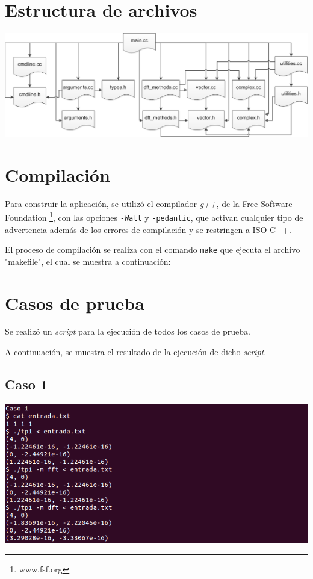 \documentclass{article}
\begin{document}
\section{Estructura de archivos}

\begin{center}
  \includegraphics[width=0.8\paperwidth]{Imagenes/jerarquia_de_archivos}
\par
\end{center}

\section{Compilación}
    Para construir la aplicación, se utilizó el compilador \textit{g++}, 
  de la Free Software Foundation \footnote{www.fsf.org}, con las opciones
  \texttt{-Wall} y \texttt{-pedantic}, que activan cualquier tipo de advertencia
  además de los errores de compilación y se restringen a ISO C++. \par
    El proceso de compilación se realiza con el comando \texttt{make} que 
  ejecuta el archivo "makefile", el cual se muestra a continuación:
  

\section{Casos de prueba}

  Se realizó un \textit{script} para la ejecución de todos los casos de prueba.
   \par
    A continuación, se muestra el resultado de la ejecución de dicho \textit{script}.
  \subsection{Caso 1}
    \begin{center}
      \includegraphics[width=0.8\paperwidth]{Imagenes/caso_1}
    \end{center}
\end{document}
